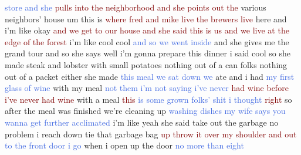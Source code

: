 \textcolor{RoyalBlue}{store} \textcolor{RoyalBlue}{and} \textcolor{RoyalBlue}{she} \textcolor{Maroon}{pulls} \textcolor{Maroon}{into} \textcolor{Maroon}{the} \textcolor{Maroon}{neighborhood} \textcolor{Maroon}{and} \textcolor{Maroon}{she} \textcolor{Maroon}{points} \textcolor{Maroon}{out} \textcolor{Maroon}{the} various neighbors' house um this is \textcolor{Maroon}{where} \textcolor{Maroon}{fred} \textcolor{Maroon}{and} \textcolor{Maroon}{mike} \textcolor{Maroon}{live} \textcolor{Maroon}{the} \textcolor{Maroon}{brewers} \textcolor{Maroon}{live} here and i'm like okay \textcolor{Maroon}{and} \textcolor{Maroon}{we} \textcolor{Maroon}{get} \textcolor{Maroon}{to} \textcolor{Maroon}{our} \textcolor{Maroon}{house} \textcolor{Maroon}{and} \textcolor{Maroon}{she} \textcolor{Maroon}{said} \textcolor{Maroon}{this} \textcolor{Maroon}{is} \textcolor{Maroon}{us} \textcolor{Maroon}{and} \textcolor{Maroon}{we} \textcolor{Maroon}{live} \textcolor{Maroon}{at} \textcolor{Maroon}{the} \textcolor{Maroon}{edge} \textcolor{Maroon}{of} \textcolor{Maroon}{the} \textcolor{Maroon}{forest} i'm like cool cool \textcolor{RoyalBlue}{and} \textcolor{RoyalBlue}{so} \textcolor{RoyalBlue}{we} \textcolor{RoyalBlue}{went} \textcolor{RoyalBlue}{inside} and she gives me the grand tour and so she says well i'm gonna prepare this dinner i said cool so she made steak and lobster with small potatoes nothing out of a can folks nothing out of a packet either she made \textcolor{RoyalBlue}{this} \textcolor{RoyalBlue}{meal} \textcolor{RoyalBlue}{we} \textcolor{RoyalBlue}{sat} \textcolor{RoyalBlue}{down} \textcolor{RoyalBlue}{we} ate and i had \textcolor{RoyalBlue}{my} \textcolor{RoyalBlue}{first} \textcolor{RoyalBlue}{glass} \textcolor{RoyalBlue}{of} \textcolor{RoyalBlue}{wine} with my meal \textcolor{RoyalBlue}{not} \textcolor{RoyalBlue}{them} \textcolor{RoyalBlue}{i'm} \textcolor{RoyalBlue}{not} \textcolor{RoyalBlue}{saying} \textcolor{RoyalBlue}{i've} \textcolor{RoyalBlue}{never} \textcolor{Maroon}{had} \textcolor{Maroon}{wine} \textcolor{Maroon}{before} \textcolor{Maroon}{i've} \textcolor{Maroon}{never} \textcolor{Maroon}{had} \textcolor{Maroon}{wine} with a meal \textcolor{Maroon}{this} \textcolor{RoyalBlue}{is} \textcolor{RoyalBlue}{some} \textcolor{RoyalBlue}{grown} \textcolor{RoyalBlue}{folks'} \textcolor{RoyalBlue}{shit} \textcolor{RoyalBlue}{i} \textcolor{RoyalBlue}{thought} \textcolor{Maroon}{right} so after the meal was finished we're cleaning up \textcolor{RoyalBlue}{washing} \textcolor{RoyalBlue}{dishes} \textcolor{RoyalBlue}{my} \textcolor{RoyalBlue}{wife} \textcolor{RoyalBlue}{says} \textcolor{RoyalBlue}{you} \textcolor{RoyalBlue}{wanna} \textcolor{RoyalBlue}{get} \textcolor{RoyalBlue}{further} \textcolor{RoyalBlue}{acclimated} i'm like yeah she said take out the garbage no problem i reach down tie that garbage bag \textcolor{Maroon}{up} \textcolor{Maroon}{throw} \textcolor{Maroon}{it} \textcolor{Maroon}{over} \textcolor{Maroon}{my} \textcolor{Maroon}{shoulder} \textcolor{Maroon}{and} \textcolor{Maroon}{out} \textcolor{RoyalBlue}{to} \textcolor{RoyalBlue}{the} \textcolor{RoyalBlue}{front} \textcolor{RoyalBlue}{door} \textcolor{RoyalBlue}{i} \textcolor{RoyalBlue}{go} when i open up the door \textcolor{RoyalBlue}{no} \textcolor{RoyalBlue}{more} \textcolor{RoyalBlue}{than} \textcolor{RoyalBlue}{eight} 